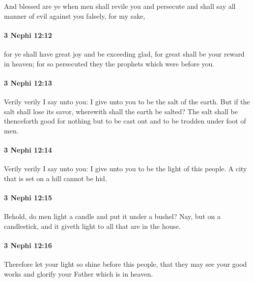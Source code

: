 			And blessed are ye when men shall revile you and persecute
			and shall say all manner of evil against you falsely, for my sake,

		\paragraph{3 Nephi 12:12} %
			\label{3NEPHI-12-12}

			for ye shall have great joy and be exceeding glad,
			for great shall be your reward in heaven;
			for so persecuted they the prophets which were before you.

		\paragraph{3 Nephi 12:13} %
			\label{3NEPHI-12-13}

			Verily verily I say unto you:
			I give unto you to be the salt of the earth.
			But if the salt shall lose its savor,
			wherewith shall the earth be salted?
			The salt shall be thenceforth good for nothing
			but to be cast out and to be trodden under foot of men.

		\paragraph{3 Nephi 12:14} %
			\label{3NEPHI-12-14}

			Verily verily I say unto you:
			I give unto you to be the light of this people.
			A city that is set on a hill cannot be hid.

		\paragraph{3 Nephi 12:15} %
			\label{3NEPHI-12-15}

			Behold, do men light a candle and put it under a bushel?
			Nay, but on a candlestick,
			and it giveth light to all that are in the house.

		\paragraph{3 Nephi 12:16} %
			\label{3NEPHI-12-16}

			Therefore let your light so shine before this people,
			that they may see your good works
			and glorify your Father which is in heaven.

